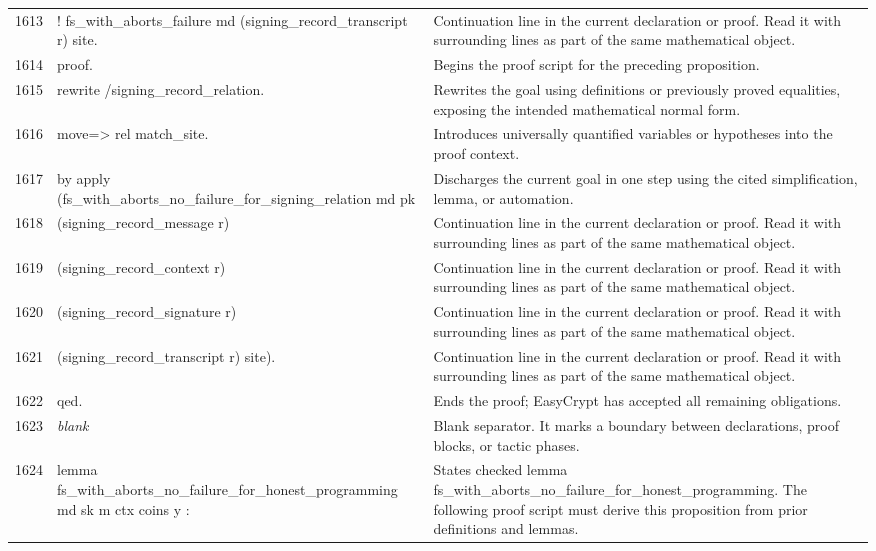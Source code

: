 \documentclass[10pt]{article}
\begin{document}
\begin{longtable}{r L{0.53\textwidth} L{0.37\textwidth}}
1613 & {\ttfamily\scriptsize   ! fs\_with\_aborts\_failure md (signing\_record\_transcript r) site.} & Continuation line in the current declaration or proof.  Read it with surrounding lines as part of the same mathematical object. \\
1614 & {\ttfamily\scriptsize proof.} & Begins the proof script for the preceding proposition. \\
1615 & {\ttfamily\scriptsize rewrite /signing\_record\_relation.} & Rewrites the goal using definitions or previously proved equalities, exposing the intended mathematical normal form. \\
1616 & {\ttfamily\scriptsize move=> rel match\_site.} & Introduces universally quantified variables or hypotheses into the proof context. \\
1617 & {\ttfamily\scriptsize by apply (fs\_with\_aborts\_no\_failure\_for\_signing\_relation md pk} & Discharges the current goal in one step using the cited simplification, lemma, or automation. \\
1618 & {\ttfamily\scriptsize             (signing\_record\_message r)} & Continuation line in the current declaration or proof.  Read it with surrounding lines as part of the same mathematical object. \\
1619 & {\ttfamily\scriptsize             (signing\_record\_context r)} & Continuation line in the current declaration or proof.  Read it with surrounding lines as part of the same mathematical object. \\
1620 & {\ttfamily\scriptsize             (signing\_record\_signature r)} & Continuation line in the current declaration or proof.  Read it with surrounding lines as part of the same mathematical object. \\
1621 & {\ttfamily\scriptsize             (signing\_record\_transcript r) site).} & Continuation line in the current declaration or proof.  Read it with surrounding lines as part of the same mathematical object. \\
1622 & {\ttfamily\scriptsize qed.} & Ends the proof; EasyCrypt has accepted all remaining obligations. \\
1623 & {\ttfamily\scriptsize \emph{blank}} & Blank separator.  It marks a boundary between declarations, proof blocks, or tactic phases. \\
1624 & {\ttfamily\scriptsize lemma fs\_with\_aborts\_no\_failure\_for\_honest\_programming md sk m ctx coins y :} & States checked lemma fs\_with\_aborts\_no\_failure\_for\_honest\_programming.  The following proof script must derive this proposition from prior definitions and lemmas. \\

\end{longtable}
\end{document}
